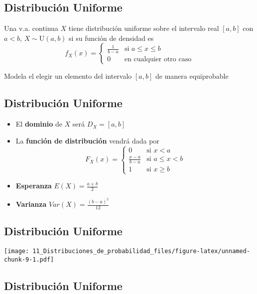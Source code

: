 \documentclass[
]{article}
\begin{document}
\hypertarget{distribuciuxf3n-uniforme}{%
\subsection{Distribución Uniforme}\label{distribuciuxf3n-uniforme}}

Una v.a. continua \(X\) tiene distribución uniforme sobre el intervalo
real \([a,b]\) con \(a<b\), \(X\sim\text{U}(a,b)\) si su función de
densidad es \[f_X(x)=\left\{
\begin{array}{rl}
     \frac{1}{b-a} & \text{si } a\le x\le b
  \\ 0 & \text{en cualquier otro caso}
\end{array}
\right.\]

Modela el elegir un elemento del intervalo \([a,b]\) de manera
equiprobable

\hypertarget{distribuciuxf3n-uniforme-1}{%
\subsection{Distribución Uniforme}\label{distribuciuxf3n-uniforme-1}}

\begin{itemize}
\item
  El \textbf{dominio} de \(X\) será \(D_X = [a,b]\)
\item
  La \textbf{función de distribución} vendrá dada por \[F_X(x)=\left\{
  \begin{array}{rl}
    0 & \text{si } x<a
  \\ \frac{x-a}{b-a} & \text{si } a\le x< b
  \\ 1 & \text{si } x\ge b
  \end{array}
  \right.\]
\item
  \textbf{Esperanza} \(E(X) = \frac{a+b}{2}\)
\item
  \textbf{Varianza} \(Var(X) = \frac{(b-a)^2}{12}\)
\end{itemize}

\hypertarget{distribuciuxf3n-uniforme-2}{%
\subsection{Distribución Uniforme}\label{distribuciuxf3n-uniforme-2}}

\texttt{[image: 11\_Distribuciones\_de\_probabilidad\_files/figure-latex/unnamed-chunk-9-1.pdf]}

\hypertarget{distribuciuxf3n-uniforme-3}{%
\subsection{Distribución Uniforme}\label{distribuciuxf3n-uniforme-3}}
\end{document}

